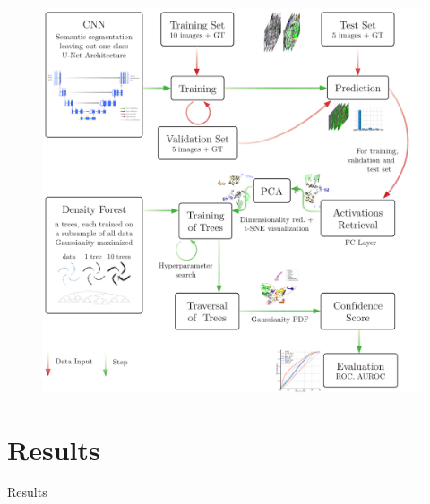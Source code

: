 \documentclass{beamer}
\begin{document}
\begin{frame}
\begin{figure}
	\centering
	\includegraphics[height=.95\textheight]{../Report/Schema/schema_df}
\end{figure}
\end{frame}

\section{Results}

\begin{frame}{Results}
\centering
\end{frame}
\end{document}
